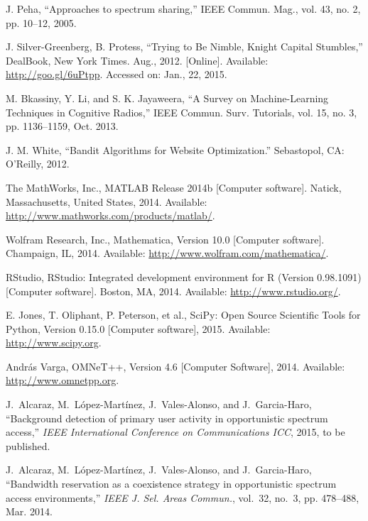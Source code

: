 \begin{thebibliography}{1}
 J. Peha, “Approaches to spectrum sharing,” IEEE Commun. Mag., vol. 43, no. 2, pp. 10–12, 2005.

J. Silver-Greenberg, B. Protess, \enquote{Trying to Be Nimble, Knight Capital Stumbles,} DealBook, New York Times. Aug., 2012. [Online]. Available: \url{http://goo.gl/6uPtpp}. Accessed on: Jan., 22, 2015.

 M. Bkassiny, Y. Li, and S. K. Jayaweera, \enquote{A Survey on Machine-Learning Techniques in Cognitive Radios,} IEEE Commun. Surv. Tutorials, vol. 15, no. 3, pp. 1136–1159, Oct. 2013.

 J. M. White, \enquote{Bandit Algorithms for Website Optimization.} Sebastopol, CA: O’Reilly, 2012.

 The MathWorks, Inc., MATLAB Release 2014b [Computer software]. Natick, Massachusetts, United States, 2014. Available: \url{http://www.mathworks.com/products/matlab/}.

 Wolfram Research, Inc., Mathematica, Version 10.0 [Computer software]. Champaign, IL, 2014. Available: \url{http://www.wolfram.com/mathematica/}.

 RStudio, RStudio: Integrated development environment for R (Version 0.98.1091) [Computer software]. Boston, MA, 2014.
Available: \url{http://www.rstudio.org/}.

 E. Jones, T. Oliphant, P. Peterson, et al., SciPy: Open Source Scientific Tools for Python, Version 0.15.0 [Computer software], 2015. Available: \url{http://www.scipy.org}.

 Andr\'{a}s Varga, OMNeT++, Version 4.6 [Computer Software], 2014. Available: \url{http://www.omnetpp.org}.

J.~Alcaraz, M.~L\'{o}pez-Mart\'{i}nez, J.~Vales-Alonso, and J.~Garcia-Haro,
  ``Background detection of primary user activity in opportunistic spectrum
  access,'' \emph{{IEEE} International Conference on Communications {ICC}},
  2015, to be published.
  
J.~Alcaraz, M.~L\'{o}pez-Mart\'{i}nez, J.~Vales-Alonso, and J.~Garcia-Haro, ``Bandwidth reservation as a coexistence strategy in opportunistic
  spectrum access environments,'' \emph{{IEEE} J. Sel. Areas Commun.}, vol.~32,
  no.~3, pp. 478--488, Mar. 2014.


\end{thebibliography}
